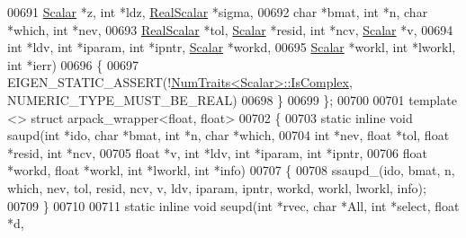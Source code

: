 \begin{DoxyCode}
00691       \hyperlink{class_eigen_1_1_arpack_generalized_self_adjoint_eigen_solver_ab1182405bfe87a505d4b7a8311c661ec}{Scalar} *z, \textcolor{keywordtype}{int} *ldz, \hyperlink{class_eigen_1_1_arpack_generalized_self_adjoint_eigen_solver_a2555af55e53bf9de894a49e639be2e1e}{RealScalar} *sigma,
00692       \textcolor{keywordtype}{char} *bmat, \textcolor{keywordtype}{int} *n, \textcolor{keywordtype}{char} *which, \textcolor{keywordtype}{int} *nev,
00693       \hyperlink{class_eigen_1_1_arpack_generalized_self_adjoint_eigen_solver_a2555af55e53bf9de894a49e639be2e1e}{RealScalar} *tol, \hyperlink{class_eigen_1_1_arpack_generalized_self_adjoint_eigen_solver_ab1182405bfe87a505d4b7a8311c661ec}{Scalar} *resid, \textcolor{keywordtype}{int} *ncv, \hyperlink{class_eigen_1_1_arpack_generalized_self_adjoint_eigen_solver_ab1182405bfe87a505d4b7a8311c661ec}{Scalar} *v,
00694       \textcolor{keywordtype}{int} *ldv, \textcolor{keywordtype}{int} *iparam, \textcolor{keywordtype}{int} *ipntr, \hyperlink{class_eigen_1_1_arpack_generalized_self_adjoint_eigen_solver_ab1182405bfe87a505d4b7a8311c661ec}{Scalar} *workd,
00695       \hyperlink{class_eigen_1_1_arpack_generalized_self_adjoint_eigen_solver_ab1182405bfe87a505d4b7a8311c661ec}{Scalar} *workl, \textcolor{keywordtype}{int} *lworkl, \textcolor{keywordtype}{int} *ierr)
00696   \{
00697     EIGEN\_STATIC\_ASSERT(!\hyperlink{group___core___module_struct_eigen_1_1_num_traits}{NumTraits<Scalar>::IsComplex}, 
      NUMERIC\_TYPE\_MUST\_BE\_REAL)
00698   \}
00699 \};
00700 
00701 \textcolor{keyword}{template} <> \textcolor{keyword}{struct }arpack\_wrapper<float, float>
00702 \{
00703   \textcolor{keyword}{static} \textcolor{keyword}{inline} \textcolor{keywordtype}{void} saupd(\textcolor{keywordtype}{int} *ido, \textcolor{keywordtype}{char} *bmat, \textcolor{keywordtype}{int} *n, \textcolor{keywordtype}{char} *which,
00704       \textcolor{keywordtype}{int} *nev, \textcolor{keywordtype}{float} *tol, \textcolor{keywordtype}{float} *resid, \textcolor{keywordtype}{int} *ncv,
00705       \textcolor{keywordtype}{float} *v, \textcolor{keywordtype}{int} *ldv, \textcolor{keywordtype}{int} *iparam, \textcolor{keywordtype}{int} *ipntr,
00706       \textcolor{keywordtype}{float} *workd, \textcolor{keywordtype}{float} *workl, \textcolor{keywordtype}{int} *lworkl, \textcolor{keywordtype}{int} *info)
00707   \{
00708     ssaupd\_(ido, bmat, n, which, nev, tol, resid, ncv, v, ldv, iparam, ipntr, workd, workl, lworkl, info);
00709   \}
00710 
00711   \textcolor{keyword}{static} \textcolor{keyword}{inline} \textcolor{keywordtype}{void} seupd(\textcolor{keywordtype}{int} *rvec, \textcolor{keywordtype}{char} *All, \textcolor{keywordtype}{int} *select, \textcolor{keywordtype}{float} *d,

\end{DoxyCode}

